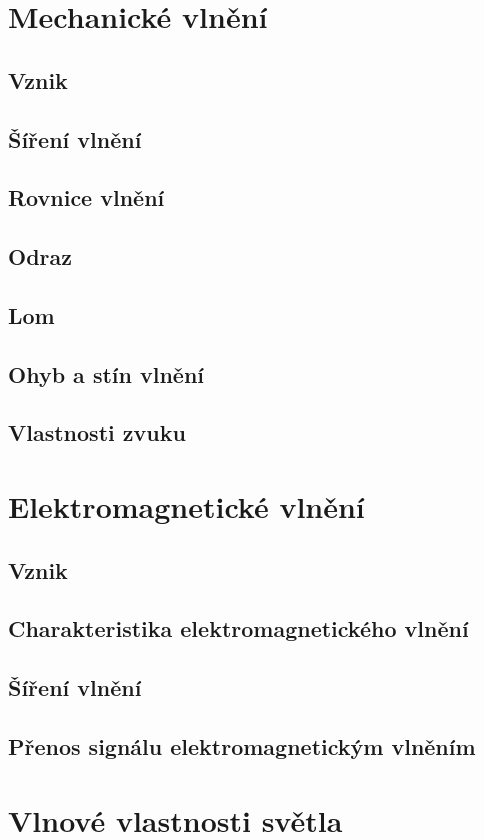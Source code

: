 \documentclass[titlepage]{book}
\begin{document}
\chapter{Mechanické vlnění}
\section{Vznik}
\section{Šíření vlnění}
\section{Rovnice vlnění}
\section{Odraz}
\section{Lom}
\section{Ohyb a stín vlnění}
\section{Vlastnosti zvuku}
\chapter{Elektromagnetické vlnění}
\section{Vznik}
\section{Charakteristika elektromagnetického vlnění}
\section{Šíření vlnění}
\section{Přenos signálu elektromagnetickým vlněním}
\chapter{Vlnové vlastnosti světla}
\end{document}

